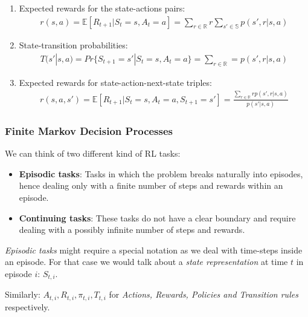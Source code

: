 \documentclass[paper=a4,fontsize=11pt]{scrartcl} %
\numberwithin{equation}{section} %
\numberwithin{figure}{section} %
\numberwithin{table}{section} %
\begin{document}
\begin{enumerate}
    \item Expected rewards for the state-actions pairs:
    \begin{align}
        r(s, a) = \mathbb{E} [ R_{t+1} | S_t=s, A_t=a ] =
        \sum_{r \in \mathbb{R}} r \sum_{s' \in \mathbb{S}} p(s',r|s, a)
    \end{align}
    
    \item State-transition probabilities:
    \begin{align}
        T(s'|s,a) = Pr\{S_{t+1}=s'|S_t=s, A_t=a\} =
        \sum_{r \in \mathbb{R}} = p(s',r|s,a)
    \end{align}
    
    \item Expected rewards for state-action-next-state triples:
    \begin{align}
        r(s, a, s') = \mathbb{E} [ R_{t+1} | S_t=s, A_t=a, S_{t+1}=s' ] =
        \frac{\sum_{r \in \mathbb{R}} rp(s',r|s,a)}{p(s'|s,a)}
    \end{align}
\end{enumerate}

\subsubsection{Finite Markov Decision Processes}

We can think of two different kind of RL tasks:

\begin{itemize}
    \item \textbf{Episodic tasks}: 
    Tasks in which the problem breaks naturally into episodes, 
    hence dealing only with a finite number of steps and rewards within an episode.
    
    \item \textbf{Continuing tasks}: These tasks do not have a clear boundary and require dealing with a possibly infinite number of steps and rewards.
\end{itemize}

\textit{Episodic tasks} might require a special notation as we deal with time-steps
inside an episode. For that case we would talk about a \textit{state representation}
at time $t$ in episode $i$: $S_{t, i}$.

Similarly: $A_{t, i}, R_{t, i}, \pi_{t, i}, T_{t, i}$ for 
\textit{Actions, Rewards, Policies and Transition rules} respectively. \\
\end{document}

